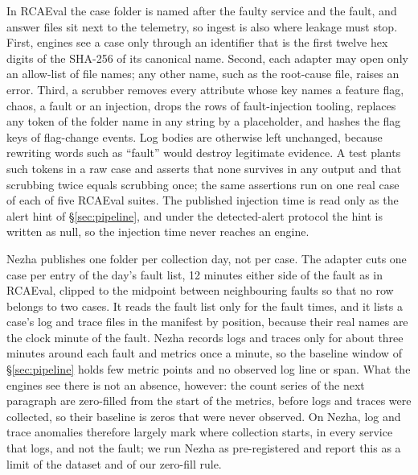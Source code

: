 In RCAEval the case folder is named after the faulty service and the fault, and answer files sit next to the telemetry, so ingest is also where leakage must stop.
First, engines see a case only through an identifier that is the first twelve hex digits of the SHA-256 of its canonical name.
Second, each adapter may open only an allow-list of file names; any other name, such as the root-cause file, raises an error.
Third, a scrubber removes every attribute whose key names a feature flag, chaos, a fault or an injection, drops the rows of fault-injection tooling, replaces any token of the folder name in any string by a placeholder, and hashes the flag keys of flag-change events.
Log bodies are otherwise left unchanged, because rewriting words such as ``fault'' would destroy legitimate evidence.
A test plants such tokens in a raw case and asserts that none survives in any output and that scrubbing twice equals scrubbing once; the same assertions run on one real case of each of five RCAEval suites.
The published injection time is read only as the alert hint of \S\ref{sec:pipeline}, and under the detected-alert protocol the hint is written as null, so the injection time never reaches an engine.

Nezha publishes one folder per collection day, not per case.
The adapter cuts one case per entry of the day's fault list, 12 minutes either side of the fault as in RCAEval, clipped to the midpoint between neighbouring faults so that no row belongs to two cases.
It reads the fault list only for the fault times, and it lists a case's log and trace files in the manifest by position, because their real names are the clock minute of the fault.
Nezha records logs and traces only for about three minutes around each fault and metrics once a minute, so the baseline window of \S\ref{sec:pipeline} holds few metric points and no observed log line or span.
What the engines see there is not an absence, however: the count series of the next paragraph are zero-filled from the start of the metrics, before logs and traces were collected, so their baseline is zeros that were never observed.
On Nezha, log and trace anomalies therefore largely mark where collection starts, in every service that logs, and not the fault; we run Nezha as pre-registered and report this as a limit of the dataset and of our zero-fill rule.


